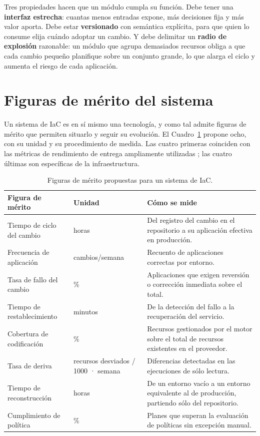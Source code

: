\documentclass[11pt,letterpaper]{article}
\begin{document}
Tres propiedades hacen que un módulo cumpla su función. Debe tener una
\textbf{interfaz estrecha}: cuantas menos entradas expone, más decisiones fija
y más valor aporta. Debe estar \textbf{versionado} con semántica explícita,
para que quien lo consume elija cuándo adoptar un cambio. Y debe delimitar un
\textbf{radio de explosión} razonable: un módulo que agrupa demasiados
recursos obliga a que cada cambio pequeño planifique sobre un conjunto grande,
lo que alarga el ciclo y aumenta el riesgo de cada aplicación.

\section{Figuras de mérito del sistema}

Un sistema de IaC es en sí mismo una tecnología, y como tal admite figuras de
mérito que permiten situarlo y seguir su evolución. El
Cuadro~\ref{tab:fom} propone ocho, con su unidad y su procedimiento de
medida. Las cuatro primeras coinciden con las métricas de rendimiento de
entrega ampliamente utilizadas \parencite{forsgren2018}; las cuatro últimas
son específicas de la infraestructura.

\begin{table}[ht]
  \centering
  \footnotesize
  \caption{Figuras de mérito propuestas para un sistema de IaC.}
  \label{tab:fom}
  \begin{tabularx}{\textwidth}{@{}>{\raggedright\arraybackslash}p{}
    >{\raggedright\arraybackslash}p{}
    >{\raggedright\arraybackslash}X@{}}
    \toprule
    \textbf{Figura de mérito} & \textbf{Unidad} & \textbf{Cómo se mide} \\
    \midrule
    Tiempo de ciclo del cambio & horas & Del registro del cambio en el
      repositorio a su aplicación efectiva en producción. \\
    Frecuencia de aplicación & cambios/semana & Recuento de aplicaciones
      correctas por entorno. \\
    Tasa de fallo del cambio & \% & Aplicaciones que exigen reversión o
      corrección inmediata sobre el total. \\
    Tiempo de restablecimiento & minutos & De la detección del fallo a la
      recuperación del servicio. \\
    Cobertura de codificación & \% & Recursos gestionados por el motor sobre
      el total de recursos existentes en el proveedor. \\
    Tasa de deriva & recursos desviados / 1000 · semana & Diferencias
      detectadas en las ejecuciones de sólo lectura. \\
    Tiempo de reconstrucción & horas & De un entorno vacío a un entorno
      equivalente al de producción, partiendo sólo del repositorio. \\
    Cumplimiento de política & \% & Planes que superan la evaluación de
      políticas sin excepción manual. \\
    \bottomrule
  \end{tabularx}
\end{table}
\end{document}
